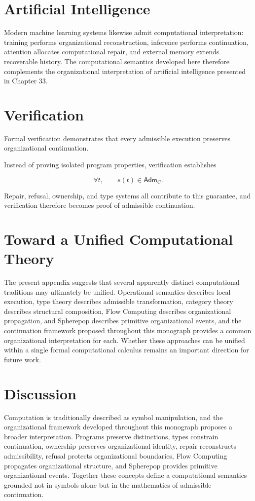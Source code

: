 \documentclass[11pt,oneside]{book}
\numberwithin{equation}{chapter}
\theoremstyle{definition}
\theoremstyle{plain}
\newcommand{\Adm}{\mathsf{Adm}}
\begin{document}
\section{Artificial Intelligence}

Modern machine learning systems likewise admit computational interpretation: training performs organizational reconstruction, inference performs continuation, attention allocates computational repair, and external memory extends recoverable history. The computational semantics developed here therefore complements the organizational interpretation of artificial intelligence presented in Chapter 33.

\section{Verification}

Formal verification demonstrates that every admissible execution
preserves organizational continuation.

Instead of proving isolated program properties, verification establishes

\[
\forall t,
\qquad
s(t)
\in
\Adm_C.
\]

Repair, refusal, ownership, and type systems all contribute to this guarantee, and verification therefore becomes proof of admissible continuation.

\section{Toward a Unified Computational Theory}

The present appendix suggests that several apparently distinct computational traditions may ultimately be unified. Operational semantics describes local execution, type theory describes admissible transformation, category theory describes structural composition, Flow Computing describes organizational propagation, and Spherepop describes primitive organizational events, and the continuation framework proposed throughout this monograph provides a common organizational interpretation for each. Whether these approaches can be unified within a single formal computational calculus remains an important direction for future work.

\section{Discussion}

Computation is traditionally described as symbol manipulation, and the organizational framework developed throughout this monograph proposes a broader interpretation. Programs preserve distinctions, types constrain continuation, ownership preserves organizational identity, repair reconstructs admissibility, refusal protects organizational boundaries, Flow Computing propagates organizational structure, and Spherepop provides primitive organizational events. Together these concepts define a computational semantics grounded not in symbols alone but in the mathematics of admissible continuation.
\end{document}
